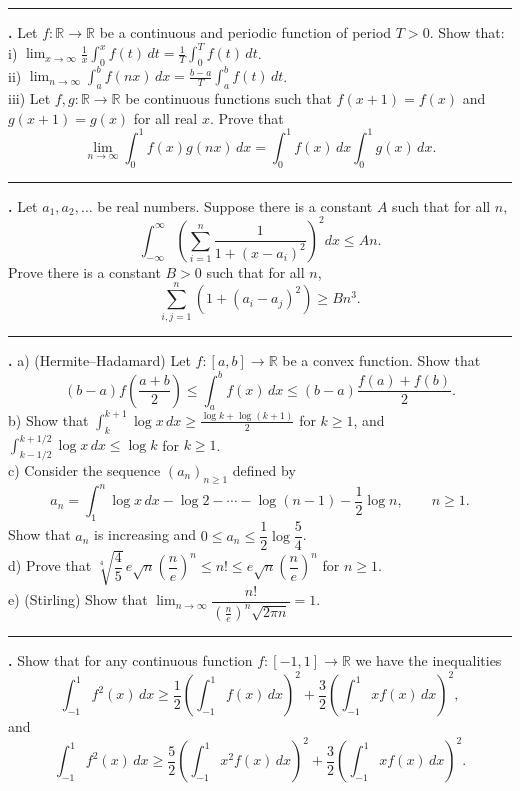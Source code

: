 \documentclass[11pt]{article}
\newcounter{probnum}
\newenvironment{problembox}{\par\noindent\rule{\linewidth}{0.5pt}\vspace{5pt}\par}{\vspace{2pt}}
\begin{document}
\begin{problembox}
\textbf{\theprobnum.} Let $f : \mathbb{R} \to \mathbb{R}$ be a continuous and periodic function of period $T > 0$. Show that:\\
i) $\displaystyle\lim_{x \to \infty} \frac{1}{x} \int_0^x f(t)\,dt = \frac{1}{T} \int_0^T f(t)\,dt$.\\
ii) $\displaystyle\lim_{n \to \infty} \int_a^b f(nx)\,dx = \frac{b-a}{T} \int_a^b f(t)\,dt$.\\
iii) Let $f, g : \mathbb{R} \to \mathbb{R}$ be continuous functions such that $f(x+1)=f(x)$ and $g(x+1)=g(x)$ for all real $x$. Prove that
\[
\lim_{n \to \infty} \int_0^1 f(x) g(nx)\,dx = \int_0^1 f(x)\,dx \int_0^1 g(x)\,dx.
\]
\end{problembox}

\begin{problembox}
\textbf{\theprobnum.} Let $a_1, a_2, \ldots$ be real numbers. Suppose there is a constant $A$ such that for all $n$,
\[
\int_{-\infty}^{\infty} \left(\sum_{i=1}^{n} \frac{1}{1+(x-a_i)^2}\right)^2 dx \le An.
\]
Prove there is a constant $B > 0$ such that for all $n$,
\[
\sum_{i,j=1}^{n} \left(1+(a_i-a_j)^2\right) \ge Bn^3.
\]
\end{problembox}

\begin{problembox}
\textbf{\theprobnum.} a) (Hermite--Hadamard) Let $f : [a,b] \to \mathbb{R}$ be a convex function. Show that
\[
(b-a) f\left(\frac{a+b}{2}\right) \le \int_a^b f(x)\,dx \le (b-a) \frac{f(a)+f(b)}{2}.
\]
b) Show that $\displaystyle\int_k^{k+1} \log x\,dx \ge \frac{\log k + \log(k+1)}{2}$ for $k \ge 1$, and $\displaystyle\int_{k-1/2}^{k+1/2} \log x\,dx \le \log k$ for $k \ge 1$.\\
c) Consider the sequence $(a_n)_{n \ge 1}$ defined by
\[
a_n = \int_1^n \log x\,dx - \log 2 - \cdots - \log(n-1) - \frac{1}{2}\log n, \qquad n \ge 1.
\]
Show that $a_n$ is increasing and $0 \le a_n \le \dfrac{1}{2}\log \dfrac{5}{4}$.\\
d) Prove that $\sqrt[4]{\dfrac{4}{5}}\, e\sqrt{n}\left(\dfrac{n}{e}\right)^n \le n! \le e\sqrt{n}\left(\dfrac{n}{e}\right)^n$ for $n \ge 1$.\\
e) (Stirling) Show that $\displaystyle\lim_{n \to \infty} \dfrac{n!}{\left(\frac{n}{e}\right)^n \sqrt{2\pi n}} = 1$.
\end{problembox}

\begin{problembox}
\textbf{\theprobnum.} Show that for any continuous function $f : [-1,1] \to \mathbb{R}$ we have the inequalities
\[
\int_{-1}^{1} f^2(x)\,dx \ge \frac{1}{2}\left(\int_{-1}^{1} f(x)\,dx\right)^2 + \frac{3}{2}\left(\int_{-1}^{1} x f(x)\,dx\right)^2,
\]
and
\[
\int_{-1}^{1} f^2(x)\,dx \ge \frac{5}{2}\left(\int_{-1}^{1} x^2 f(x)\,dx\right)^2 + \frac{3}{2}\left(\int_{-1}^{1} x f(x)\,dx\right)^2.
\]
\end{problembox}
\end{document}
